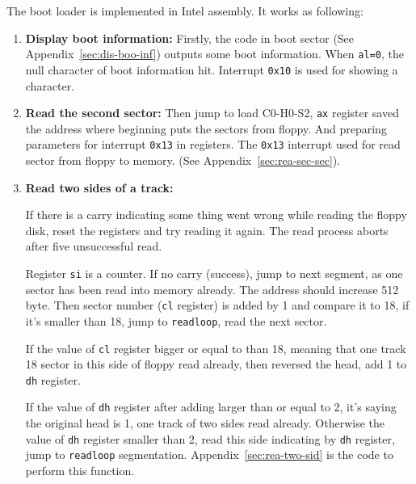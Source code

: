 \documentclass{swfcthesis}
\begin{document}
The boot loader is implemented in Intel assembly. It works as following:

\begin{enumerate}
\item \textbf{Display boot information:} Firstly, the code in boot sector (See
  Appendix~\ref{sec:dis-boo-inf}) outputs some boot information. When \texttt{al=0}, the
  null character of boot information hit. Interrupt \texttt{0x10} is used for showing a
  character.
\item \textbf{Read the second sector:} Then jump to load C0-H0-S2, \texttt{ax} register
  saved the address where beginning puts the sectors from floppy. And preparing parameters
  for interrupt \texttt{0x13} in registers. The \texttt{0x13} interrupt used for read
  sector from floppy to memory. (See Appendix~\ref{sec:rea-sec-sec}).
\item \textbf{Read two sides of a track:} 
  
  If there is a carry indicating some thing went wrong while reading the floppy disk,
  reset the registers and try reading it again. The read process aborts after five
  unsuccessful read.

  Register \texttt{si} is a counter. If no carry (success), jump to next segment, as one
  sector has been read into memory already. The address should increase 512 byte. Then
  sector number (\texttt{cl} register) is added by 1 and compare it to 18, if it's smaller
  than 18, jump to \texttt{readloop}, read the next sector.

  If the value of \texttt{cl} register bigger or equal to than 18, meaning that one track
  18 sector in this side of floppy read already, then reversed the head, add 1 to
  \texttt{dh} register.

  If the value of \texttt{dh} register after adding larger than or equal to 2, it's saying
  the original head is 1, one track of two sides read already. Otherwise the value of
  \texttt{dh} register smaller than 2, read this side indicating by \texttt{dh} register,
  jump to \texttt{readloop} segmentation. Appendix~\ref{sec:rea-two-sid} is the code to
  perform this function.


\end{enumerate}
\end{document}
